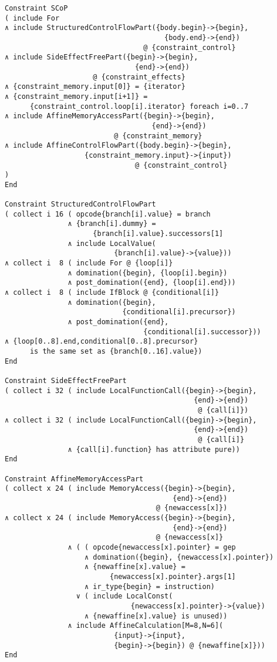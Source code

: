 \begin{lstlisting}[language=CAnDL,basicstyle=\linespread{0.85}\small\ttfamily]
Constraint SCoP
( include For
∧ include StructuredControlFlowPart({body.begin}->{begin},
                                      {body.end}->{end})
                                 @ {constraint_control}
∧ include SideEffectFreePart({begin}->{begin},
                               {end}->{end})
                     @ {constraint_effects}
∧ {constraint_memory.input[0]} = {iterator}
∧ {constraint_memory.input[i+1]} =
      {constraint_control.loop[i].iterator} foreach i=0..7
∧ include AffineMemoryAccessPart({begin}->{begin},
                                   {end}->{end})
                          @ {constraint_memory}
∧ include AffineControlFlowPart({body.begin}->{begin},
                   {constraint_memory.input}->{input})
                               @ {constraint_control}
)
End

Constraint StructuredControlFlowPart
( collect i 16 ( opcode{branch[i].value} = branch
               ∧ {branch[i].dummy} =
                     {branch[i].value}.successors[1]
               ∧ include LocalValue(
                          {branch[i].value}->{value}))
∧ collect i  8 ( include For @ {loop[i]}
               ∧ domination({begin}, {loop[i].begin})
               ∧ post_domination({end}, {loop[i].end}))
∧ collect i  8 ( include IfBlock @ {conditional[i]}
               ∧ domination({begin},
                            {conditional[i].precursor})
               ∧ post_domination({end},
                                 {conditional[i].successor}))
∧ {loop[0..8].end,conditional[0..8].precursor}
      is the same set as {branch[0..16].value})
End

Constraint SideEffectFreePart
( collect i 32 ( include LocalFunctionCall({begin}->{begin},
                                             {end}->{end})
                                              @ {call[i]}) 
∧ collect i 32 ( include LocalFunctionCall({begin}->{begin},
                                             {end}->{end})
                                              @ {call[i]}
               ∧ {call[i].function} has attribute pure))
End

Constraint AffineMemoryAccessPart
( collect x 24 ( include MemoryAccess({begin}->{begin},
                                        {end}->{end})
                                    @ {newaccess[x]})
∧ collect x 24 ( include MemoryAccess({begin}->{begin},
                                        {end}->{end})
                                    @ {newaccess[x]}
               ∧ ( ( opcode{newaccess[x].pointer} = gep
                   ∧ domination({begin}, {newaccess[x].pointer})
                   ∧ {newaffine[x].value} =
                         {newaccess[x].pointer}.args[1]
                   ∧ ir_type{begin} = instruction)
                 ∨ ( include LocalConst(
                              {newaccess[x].pointer}->{value})
                   ∧ {newaffine[x].value} is unused))
               ∧ include AffineCalculation[M=8,N=6](
                          {input}->{input},
                          {begin}->{begin}) @ {newaffine[x]}))
End


\end{lstlisting}
